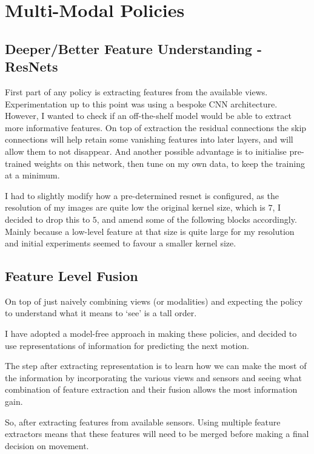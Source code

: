 \section{Multi-Modal Policies}

\subsection{Deeper/Better Feature Understanding - ResNets}
First part of any policy is extracting features from the available views. Experimentation up to this point was using a bespoke CNN architecture. However, I wanted to check if an off-the-shelf model would be able to extract more informative features. On top of extraction the residual connections the skip connections will help retain some vanishing features into later layers, and will allow them to not disappear. And another possible advantage is to initialise pre-trained weights on this network, then tune on my own data, to keep the training at a minimum.

I had to slightly modify how a pre-determined resnet is configured, as the resolution of my images are quite low the original kernel size, which is $7$, I decided to drop this to $5$, and amend some of the following blocks accordingly. Mainly because a low-level feature at that size is quite large for my resolution and initial experiments seemed to favour a smaller kernel size.

\subsection{Feature Level Fusion}
On top of just naively combining views (or modalities) and expecting the policy to understand what it means to `see' is a tall order. 

I have adopted a model-free approach in making these policies, and decided to use representations of information for predicting the next motion.

The step after extracting representation is to learn how we can make the most of the information by incorporating the various views and sensors and seeing what combination of feature extraction and their fusion allows the most information gain.

So, after extracting features from available sensors. Using multiple feature extractors means that these features will need to be merged before making a final decision on movement.

